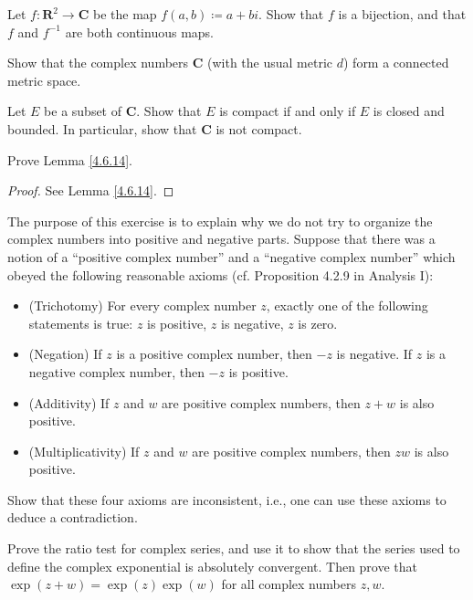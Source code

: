 \begin{exercise}\label{ex 4.6.11}
    Let \(f : \mathbf{R}^2 \to \mathbf{C}\) be the map \(f(a, b) \coloneqq a + bi\).
    Show that \(f\) is a bijection, and that \(f\) and \(f^{-1}\) are both continuous maps.
\end{exercise}

\begin{exercise}\label{ex 4.6.12}
    Show that the complex numbers \(\mathbf{C}\) (with the usual metric \(d\)) form a connected metric space.
\end{exercise}

\begin{exercise}\label{ex 4.6.13}
    Let \(E\) be a subset of \(\mathbf{C}\).
    Show that \(E\) is compact if and only if \(E\) is closed and bounded.
    In particular, show that \(\mathbf{C}\) is not compact.
\end{exercise}

\begin{exercise}\label{ex 4.6.14}
    Prove Lemma \ref{4.6.14}.
\end{exercise}

\begin{proof}
    See Lemma \ref{4.6.14}.
\end{proof}

\begin{exercise}\label{ex 4.6.15}
    The purpose of this exercise is to explain why we do not try to organize the complex numbers into positive and negative parts.
    Suppose that there was a notion of a ``positive complex number'' and a ``negative complex number'' which obeyed the following reasonable axioms (cf. Proposition 4.2.9 in Analysis I):
    \begin{itemize}
        \item (Trichotomy)
              For every complex number \(z\), exactly one of the following statements is true:
              \(z\) is positive, \(z\) is negative, \(z\) is zero.
        \item (Negation)
              If \(z\) is a positive complex number, then \(-z\) is negative.
              If \(z\) is a negative complex number, then \(-z\) is positive.
        \item (Additivity)
              If \(z\) and \(w\) are positive complex numbers, then \(z + w\) is also positive.
        \item (Multiplicativity)
              If \(z\) and \(w\) are positive complex numbers, then \(zw\) is also positive.
    \end{itemize}
    Show that these four axioms are inconsistent, i.e., one can use these axioms to deduce a contradiction.
\end{exercise}

\begin{exercise}\label{ex 4.6.16}
    Prove the ratio test for complex series, and use it to show that the series used to define the complex exponential is absolutely convergent.
    Then prove that \(\exp(z + w) = \exp(z) \exp(w)\) for all complex numbers \(z, w\).
\end{exercise}